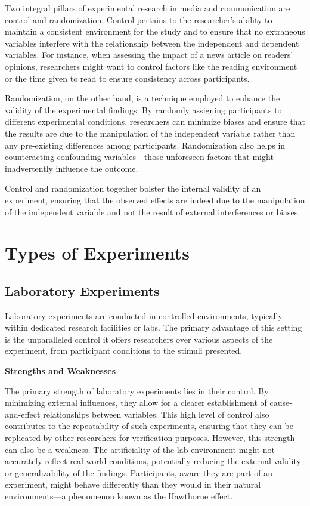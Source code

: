 \documentclass[
  b5paper]{book}
\begin{document}
Two integral pillars of experimental research in media and communication are control and randomization. Control pertains to the researcher's ability to maintain a consistent environment for the study and to ensure that no extraneous variables interfere with the relationship between the independent and dependent variables. For instance, when assessing the impact of a news article on readers' opinions, researchers might want to control factors like the reading environment or the time given to read to ensure consistency across participants.

Randomization, on the other hand, is a technique employed to enhance the validity of the experimental findings. By randomly assigning participants to different experimental conditions, researchers can minimize biases and ensure that the results are due to the manipulation of the independent variable rather than any pre-existing differences among participants. Randomization also helps in counteracting confounding variables---those unforeseen factors that might inadvertently influence the outcome.

Control and randomization together bolster the internal validity of an experiment, ensuring that the observed effects are indeed due to the manipulation of the independent variable and not the result of external interferences or biases.

\hypertarget{types-of-experiments}{%
\section{Types of Experiments}\label{types-of-experiments}}

\hypertarget{laboratory-experiments}{%
\subsection*{Laboratory Experiments}\label{laboratory-experiments}}

Laboratory experiments are conducted in controlled environments, typically within dedicated research facilities or labs. The primary advantage of this setting is the unparalleled control it offers researchers over various aspects of the experiment, from participant conditions to the stimuli presented.

\textbf{Strengths and Weaknesses}

The primary strength of laboratory experiments lies in their control. By minimizing external influences, they allow for a clearer establishment of cause-and-effect relationships between variables. This high level of control also contributes to the repeatability of such experiments, ensuring that they can be replicated by other researchers for verification purposes. However, this strength can also be a weakness. The artificiality of the lab environment might not accurately reflect real-world conditions, potentially reducing the external validity or generalizability of the findings. Participants, aware they are part of an experiment, might behave differently than they would in their natural environments---a phenomenon known as the Hawthorne effect.
\end{document}
